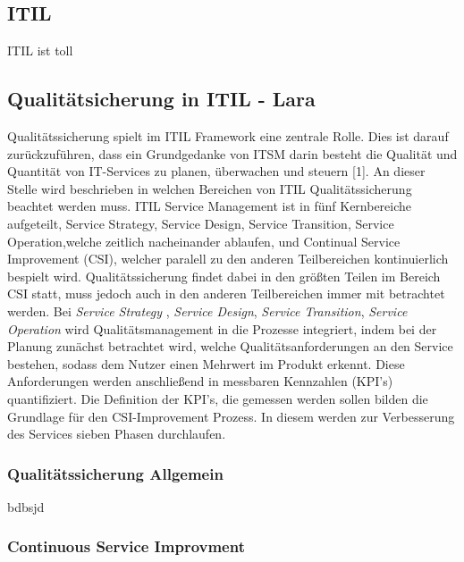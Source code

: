 \documentclass[sigconf]{acmart}
\begin{document}
\subsection{ITIL}
ITIL ist toll
\subsection{Qualitätsicherung in ITIL - Lara}
Qualitätssicherung spielt im ITIL Framework eine zentrale Rolle.
Dies ist darauf zurückzuführen, dass ein Grundgedanke von ITSM
darin besteht die Qualität und Quantität von IT-Services zu planen,
überwachen und steuern [1]. An dieser Stelle wird beschrieben in
welchen Bereichen von ITIL Qualitätssicherung beachtet werden
muss.
ITIL Service Management ist in fünf Kernbereiche aufgeteilt, Service
Strategy, Service Design, Service Transition, Service Operation,welche
zeitlich nacheinander ablaufen, und Continual Service Improvement
(CSI), welcher paralell zu den anderen Teilbereichen kontinuierlich
bespielt wird. Qualitätssicherung findet dabei in den größten Teilen
im Bereich CSI statt, muss jedoch auch in den anderen Teilbereichen
immer mit betrachtet werden. Bei \textit{Service Strategy} , \textit{Service Design},
\textit{Service Transition}, \textit{Service Operation} wird Qualitätsmanagement
in die Prozesse integriert, indem bei der Planung zunächst betrachtet
wird, welche Qualitätsanforderungen an den Service bestehen,
sodass dem Nutzer einen Mehrwert im Produkt erkennt. Diese Anforderungen
werden anschließend in messbaren Kennzahlen (KPI’s)
quantifiziert. Die Definition der KPI’s, die gemessen werden sollen
bilden die Grundlage für den CSI-Improvement Prozess. In diesem
werden zur Verbesserung des Services sieben Phasen durchlaufen.
\subsubsection{Qualitätssicherung Allgemein}
bdbsjd
\subsubsection{Continuous Service Improvment}
\end{document}
